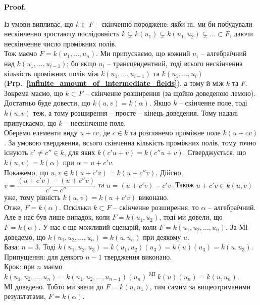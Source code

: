 \documentclass[a4paper, 10pt]{article}
\makeatletter
\theoremstyle{theoremdd}
\theoremstyle{theoremdd}
\theoremstyle{theoremdd}
\theoremstyle{theoremdd}
\theoremstyle{theoremdd}
\theoremstyle{theoremdd}
\theoremstyle{theoremdd}
\theoremstyle{theoremdd}
\theoremstyle{theoremdd}
\theoremstyle{theoremdd}
\theoremstyle{theoremdd}
\theoremstyle{theoremdd}
\theoremstyle{theoremdd}
\theoremstyle{theoremdd}
\theoremstyle{theoremdd}
\renewenvironment{proof}[1][Proof.\\]{\par
\pushQED{\hfill \qed}%
\normalfont \topsep6\p@\@plus6\p@\relax
\trivlist
\item\relax
{\bfseries
#1\@addpunct{.}}\hspace\labelsep\ignorespaces
}{%
\popQED\endtrivlist\@endpefalse
}
\newcommand\prpref[1]{\textbf{Prp.~\ref{#1}}}
\makeatother
\begin{document}
\begin{proof}
Із умови випливає, що $k \subset F$ -- скінченно породжене: якби ні, ми би побудували нескінченно зростаючу послідовність $k \subsetneq k(u_1) \subsetneq k(u_1,u_2) \subsetneq \dots \subset F$, даючи нескінченне число проміжних полів.\\
Тож маємо $F = k(u_1,\dots,u_n)$. Ми припускаємо, що кожний $u_i$ -- алгебраїчний над $k(u_1,\dots,u_{i-1})$; бо якщо $u_i$ -- трансцендентний, тоді всього нескінченна кількість проміжних полів між $k(u_1,\dots,u_{i-1})$ та $k(u_1,\dots,u_i)$ (\prpref{infinite_amount_of_intermediate_fields}), а тому й між $k$ та $F$. Зокрема маємо, що $k \subset F$ -- скінченне розширення (за щойно доведеною лемою).\\
Достатньо буде довести, що $k(u,v) = k(\alpha)$. Якщо $k$ -- скінченне поле, тоді $k(u,v)$ теж, а тому розширення -- просте -- кінець доведення. Тому надалі припускаємо, що $k$ -- нескінченне поле.\\
\iffalse
Ми можемо показати, що $k(u_1,\dots,u_n) = k(u,v)$ для деякого $u$ та $v = u_n$ для всіх $n \geq 3$. Доведення за МІ (TODO: усвідомити).\\
Отже, маємо $F = k(u,v)$. Якщо $k$ -- скінченне поле, тоді й $F$ теж, тому розширення -- просте -- кінець доведення. Надалі припускаємо, що $k$ -- нескінченне поле.\\
\fi
Оберемо елементи виду $u + cv$, де $c \in k$ та розглянемо проміжне поле $k(u+cv)$. За умовою твердження, всього скінченна кількість проміжних полів, тому точно існують $c' \neq c'' \in k$, для яких $k(c'u+v) = k(c''u+v)$. Стверджується, що $k(u,v) = k(\alpha)$ при $\alpha = u + c'v$.\\
Покажемо, що $u,v \in k(u + c'v) = k(u + c''v)$. Дійсно, $v = \dfrac{(u+c'v) - (u+c''v)}{c'-c''}$ та $u = (u+c'v) - c'v$. Також $u + c'v \in k(u,v)$ уже, тому рівність $k(u,v) = k(u + c'v)$ виконано.\\
Отже, $F = k(\alpha)$. Оскільки $k \subset F$ -- скінченне розширення, то $\alpha$ -- алгебраїчний.\\
Але в нас був лише випадок, коли $F = k(u_1,u_2)$, тоді ми довели, що $F = k(\alpha)$. У нас є ще можливий сценарій, коли $F = k(u_1,u_2,\dots,u_n)$. За МІ доведемо, що $k(u_1,u_2,\dots,u_n) = k(u,u_n)$ при деякому $u$.\\
База: $n = 3$. Тоді $k(u_1,u_2,u_3) = k(u_1,u_2)(u_3) = k(u)(u_3) = k(u,u_3)$.\\
Припущення: для деякого $n-1$ твердження виконано.\\
Крок: при $n$ маємо $k(u_1,u_2,\dots,u_n) = k(u_1,u_2,\dots,u_{n-1})(u_n) \overset{\text{MI}}{=} k(u)(u_n) = k(u,u_n)$.\\
МІ доведено. Тобто ми звели до $F = k(u,u_1)$, тим самим за вищеотриманими результатами, $F = k(\alpha)$.
\end{proof}
\end{document}
